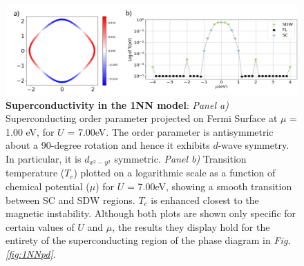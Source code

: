 \documentclass[11pt]{article}
\begin{document}
\begin{figure}[htbp]  %
    \centering
    \includegraphics[width=1.0\textwidth]{1NNSC.png}  %
    \caption{\textbf{Superconductivity in the 1NN model}:  
    \textit{Panel a)} Superconducting order parameter projected on Fermi Surface at $\mu$ = 1.00 eV, 
    for $U$ = 7.00eV. The order parameter is antisymmetric about a 90-degree rotation and hence
    it exhibits $d$-wave symmetry. In particular, it is $d_{x^2-y^2}$ symmetric. 
    \textit{Panel b)} Transition temperature ($T_c$) plotted on a logarithmic scale as a function of chemical potential ($\mu$) for $U$ = 7.00eV, showing
    a smooth transition between SC and SDW regions.
    $T_c$ is enhanced closest to the magnetic instability. 
    Although both plots are shown only specific for certain values of $U$ and $\mu$, the results they display hold for the entirety of
    the superconducting region of the phase diagram in \textit{Fig.\ref{fig:1NNpd}}.  
    }
    \label{fig:1NNSC}
\end{figure}
\end{document}
